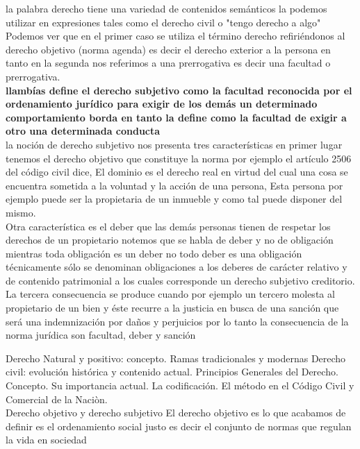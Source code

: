 \documentclass[12pt]{book}
\begin{document}
la palabra derecho tiene una variedad de contenidos semánticos la podemos utilizar en expresiones tales como el derecho civil o "tengo derecho a algo"
\\
Podemos ver que en el primer caso se utiliza el término derecho refiriéndonos al derecho objetivo (norma agenda) es decir el derecho exterior a la persona en tanto en la segunda nos referimos a una prerrogativa es decir una facultad o prerrogativa.
\\
\textbf{llambías define el derecho subjetivo como la facultad reconocida por el ordenamiento jurídico para exigir de los demás un determinado comportamiento borda en tanto la define como la facultad de exigir a otro una determinada conducta}
\\
la noción de derecho subjetivo nos presenta tres características en primer lugar tenemos el derecho objetivo que constituye la norma por ejemplo el artículo 2506 del código civil dice, El dominio es el derecho real en virtud del cual una cosa se encuentra sometida a la voluntad y la acción de una persona, Esta persona por ejemplo puede ser la propietaria de un inmueble y como tal puede disponer del mismo.
\\
Otra característica es el deber que las demás personas tienen de respetar los derechos de un propietario notemos que se habla de deber y no de obligación mientras toda obligación es un deber no todo deber es una obligación técnicamente sólo se denominan obligaciones a los deberes de carácter relativo y de contenido patrimonial a los cuales corresponde un derecho subjetivo creditorio.
\\
La tercera consecuencia se produce cuando por ejemplo un tercero molesta al propietario de un bien y éste recurre a la justicia en busca de una sanción que será una indemnización por daños y perjuicios por lo tanto la consecuencia de la norma jurídica son facultad, deber y sanción









Derecho Natural y positivo: concepto. Ramas tradicionales y modernas
Derecho civil: evolución histórica y contenido actual.
Principios Generales del Derecho. Concepto. Su importancia actual.
La codificación. El método en el Código Civil y Comercial de la Naciòn.
\\ 


Derecho objetivo y derecho subjetivo
El derecho objetivo es lo que acabamos de definir es el ordenamiento social justo es decir el conjunto de normas que regulan la vida en sociedad
\end{document}
